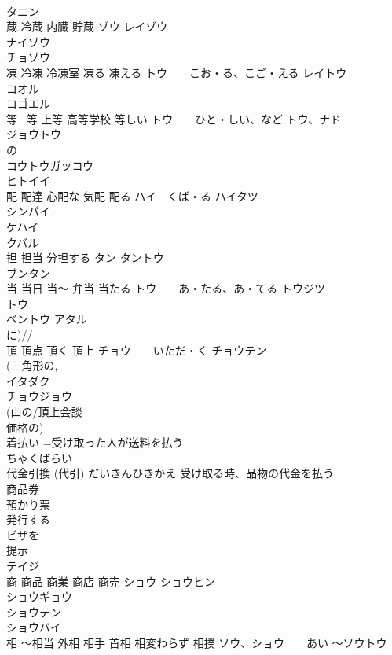 \documentclass[8pt]{extreport}
\begin{document}
\begin{CJK}{UTF8}{min}
\\	タニン
\\	蔵 冷蔵 内臓 貯蔵	ゾウ レイゾウ
\\	ナイゾウ
\\	チョゾウ
\\	凍 冷凍 冷凍室 凍る 凍える	トウ　　こお・る、こご・える レイトウ
\\	コオル
\\	コゴエル
\\	等 ~等 上等 高等学校 等しい	トウ　　ひと・しい、など トウ、ナド 
\\	ジョウトウ
\\	の
\\	コウトウガッコウ
\\	ヒトイイ
\\	配 配達 心配な 気配 配る	ハイ　くば・る ハイタツ
\\	シンパイ 
\\	ケハイ
\\	クバル
\\	担 担当 分担する	タン タントウ
\\	ブンタン
\\	当 当日 当〜 弁当 当たる	トウ　　あ・たる、あ・てる トウジツ　
\\	トウ~
\\	ベントウ アタル 
\\	に)//
\\	頂 頂点 頂く 頂上	チョウ　　いただ・く チョウテン 
\\	(三角形の, 
\\	イタダク
\\	チョウジョウ
\\	(山の/頂上会談
\\	価格の)
\\	着払い	=受け取った人が送料を払う 
\\	ちゃくばらい
\\	代金引換 (代引)	だいきんひきかえ 受け取る時、品物の代金を払う 
\\	商品券	
\\	預かり票	
\\	発行する	
\\	ビザを
\\	提示	
\\	テイジ
\\	商 商品 商業 商店 商売	ショウ ショウヒン　
\\	ショウギョウ
\\	ショウテン
\\	ショウバイ
\\	相 〜相当 外相 相手 首相 相変わらず 相撲	ソウ、ショウ　　あい 〜ソウトウ 

\end{CJK}
\end{document}
